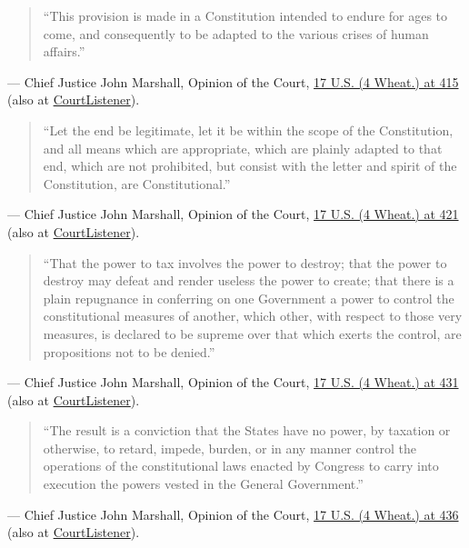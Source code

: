 \documentclass[12pt]{article}
\begin{document}
\begin{quote}
``This provision is made in a Constitution intended to endure for ages to come, and consequently to be adapted to the various crises of human affairs.''
\end{quote}
\noindent --- Chief Justice John Marshall, Opinion of the Court, \href{https://supreme.justia.com/cases/federal/us/17/316/}{17 U.S. (4 Wheat.) at 415} (also at \href{https://www.courtlistener.com/opinion/85272/mculloch-v-state-of-maryland/}{CourtListener}).

\begin{quote}
``Let the end be legitimate, let it be within the scope of the Constitution, and all means which are appropriate, which are plainly adapted to that end, which are not prohibited, but consist with the letter and spirit of the Constitution, are Constitutional.''
\end{quote}
\noindent --- Chief Justice John Marshall, Opinion of the Court, \href{https://supreme.justia.com/cases/federal/us/17/316/}{17 U.S. (4 Wheat.) at 421} (also at \href{https://www.courtlistener.com/opinion/85272/mculloch-v-state-of-maryland/}{CourtListener}).

\begin{quote}
``That the power to tax involves the power to destroy; that the power to destroy may defeat and render useless the power to create; that there is a plain repugnance in conferring on one Government a power to control the constitutional measures of another, which other, with respect to those very measures, is declared to be supreme over that which exerts the control, are propositions not to be denied.''
\end{quote}
\noindent --- Chief Justice John Marshall, Opinion of the Court, \href{https://supreme.justia.com/cases/federal/us/17/316/}{17 U.S. (4 Wheat.) at 431} (also at \href{https://www.courtlistener.com/opinion/85272/mculloch-v-state-of-maryland/}{CourtListener}).

\begin{quote}
``The result is a conviction that the States have no power, by taxation or otherwise, to retard, impede, burden, or in any manner control the operations of the constitutional laws enacted by Congress to carry into execution the powers vested in the General Government.''
\end{quote}
\noindent --- Chief Justice John Marshall, Opinion of the Court, \href{https://supreme.justia.com/cases/federal/us/17/316/}{17 U.S. (4 Wheat.) at 436} (also at \href{https://www.courtlistener.com/opinion/85272/mculloch-v-state-of-maryland/}{CourtListener}).
\end{document}
